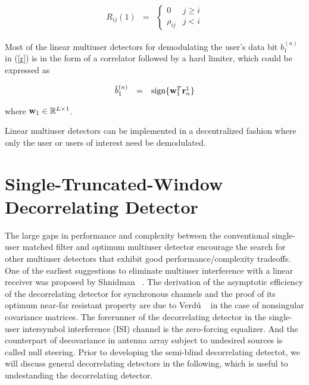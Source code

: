 \documentclass[a4paper,11pt,fleqn]{article}
\newcommand{\br}{{\mathbf r}}
\newcommand{\bw}{{\bf w}}
\begin{document}
\begin{equation}
\begin{array}{rcl}
R_{ij}(1)&=&\left\{
\begin{array}{ll}
0&j\geq i\\ \rho_{ij}&j<i
\end{array}\right.
\end{array}
\end{equation}

Most of the linear multiuser detectors for demodulating the user's
data bit $b_1^{(n)}$ in (\ref{r}) is in the form of a correlator
followed by a hard limiter, which could be expressed as

\begin{equation}
\begin{array}{rcl}
\hat{b}_1^{(n)} &=& \mbox{sign}\{\bw_1^T\br_n^1\}
\end{array} \label{linear}
\end{equation}

\noindent where $\bw_1 \in \mathbb{R}^{L\times 1}$.

Linear multiuser detectors can be implemented in a decentralized
fashion where only the user or users of interest need be
demodulated.

\section{Single-Truncated-Window Decorrelating Detector}

The large gaps in performance and complexity between the
conventional single-user matched filter and optimum multiuser
detector encourage the search for other multiuser detectors that
exhibit good performance/complexity tradeoffs. One of the earliest
suggestions to eliminate multiuser interference with a linear
receiver was proposed by Shnidman ~\cite{Shni67}. The derivation
of the asymptotic efficiency of the decorrelating detector for
synchronous channels and the proof of its optimum near-far
resistant property are due to Verd\'u ~\cite{Verd86} in the case
of nonsingular covariance matrices. The forerunner of the
decorrelating detector in the single-user intersymbol interference
(ISI) channel is the zero-forcing equalizer. And the counterpart
of decovariance in antenna array subject to undesired sources is
called null steering. Prior to developing the semi-blind
decorrelating detectot, we will discuss general decorrelating
detectors in the following, which is useful to undestanding the
decorrelating detector.
\end{document}
